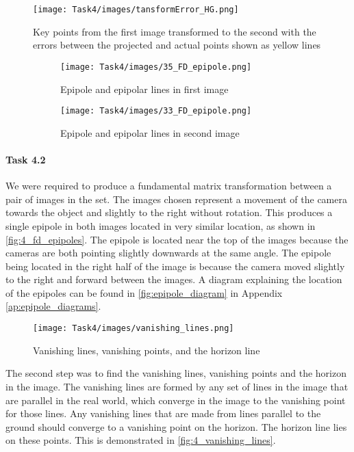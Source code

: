 \begin{figure}
    \centering
    \texttt{[image: Task4/images/tansformError\_HG.png]}
    \caption{Key points from the first image transformed to the second with the errors between the projected and actual points shown as yellow lines}
    \label{fig:4_hg_transform_error}
\end{figure}

\begin{figure}
    \centering
    \begin{subfigure}{0.49\linewidth}
        \centering
        \texttt{[image: Task4/images/35\_FD\_epipole.png]}
        \caption{Epipole and epipolar lines \linebreak in first image}
        \label{subfig:4_fd_epipoles:1}
    \end{subfigure}
    \begin{subfigure}{0.49\linewidth}
        \centering
        \texttt{[image: Task4/images/33\_FD\_epipole.png]}
        \caption{Epipole and epipolar lines in second image}
        \label{subfig:4_fd_epipoles:2}
    \end{subfigure}
    \caption{}
    \label{fig:4_fd_epipoles}
\end{figure}

\paragraph{Task 4.2} We were required to produce a fundamental matrix transformation between a pair of images in the \FD set. The images chosen represent a movement of the camera towards the object and slightly to the right without rotation. This produces a single epipole in both images located in very similar location, as shown in \autoref{fig:4_fd_epipoles}. The epipole is located near the top of the images because the cameras are both pointing slightly downwards at the same angle. The epipole being located in the right half of the image is because the camera moved slightly to the right and forward between the images. A diagram explaining the location of the epipoles can be found in \autoref{fig:epipole_diagram} in Appendix \ref{ap:epipole_diagrams}. 

\begin{figure}
    \centering
    \texttt{[image: Task4/images/vanishing\_lines.png]}
    \caption{Vanishing lines, vanishing points, and the horizon line}
    \label{fig:4_vanishing_lines}
\end{figure}

The second step was to find the vanishing lines, vanishing points and the horizon in the image. The vanishing lines are formed by any set of lines in the image that are parallel in the real world, which converge in the image to the vanishing point for those lines. Any vanishing lines that are made from lines parallel to the ground should converge to a vanishing point on the horizon. The horizon line lies on these points. This is demonstrated in \autoref{fig:4_vanishing_lines}.